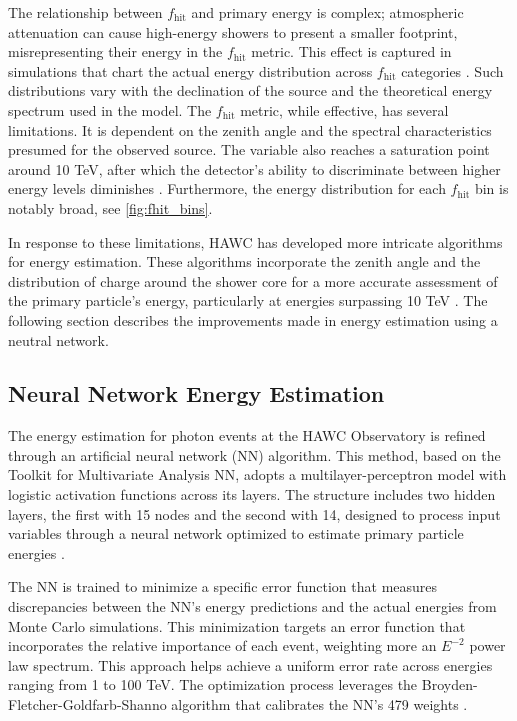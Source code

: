 The relationship between $f_{\text{hit}}$ and primary energy is complex; atmospheric attenuation can cause high-energy showers to present a smaller footprint, misrepresenting their energy in the $f_{\text{hit}}$ metric.
This effect is captured in simulations that chart the actual energy distribution across $f_{\text{hit}}$ categories \cite{wcd_Sensitivity}.
Such distributions vary with the declination of the source and the theoretical energy spectrum used in the model.
The $f_{\text{hit}}$ metric, while effective, has several limitations.
It is dependent on the zenith angle and the spectral characteristics presumed for the observed source.
The variable also reaches a saturation point around 10 TeV, after which the detector's ability to discriminate between higher energy levels diminishes \cite{Abeysekara_2017}.
Furthermore, the energy distribution for each $f_{\text{hit}}$ bin is notably broad, see \cref{fig:fhit_bins}.

In response to these limitations, HAWC has developed more intricate algorithms for energy estimation.
These algorithms incorporate the zenith angle and the distribution of charge around the shower core for a more accurate assessment of the primary particle's energy, particularly at energies surpassing 10 TeV \cite{wcd_Sensitivity}.
The following section describes the improvements made in energy estimation using a neutral network.

\subsection{Neural Network Energy Estimation}\label{sec:hawc_nn}

The energy estimation for photon events at the HAWC Observatory is refined through an artificial neural network (NN) algorithm.
This method, based on the Toolkit for Multivariate Analysis NN, adopts a multilayer-perceptron model with logistic activation functions across its layers.
The structure includes two hidden layers, the first with 15 nodes and the second with 14, designed to process input variables through a neural network optimized to estimate primary particle energies \cite{thesis_SamM}.

The NN is trained to minimize a specific error function that measures discrepancies between the NN's energy predictions and the actual energies from Monte Carlo simulations.
This minimization targets an error function that incorporates the relative importance of each event, weighting more an $E^{-2}$ power law spectrum.
This approach helps achieve a uniform error rate across energies ranging from 1 to 100 TeV.
The optimization process leverages the Broyden-Fletcher-Goldfarb-Shanno algorithm that calibrates the NN's 479 weights \cite{100TEV_Crab_HAWC}.

